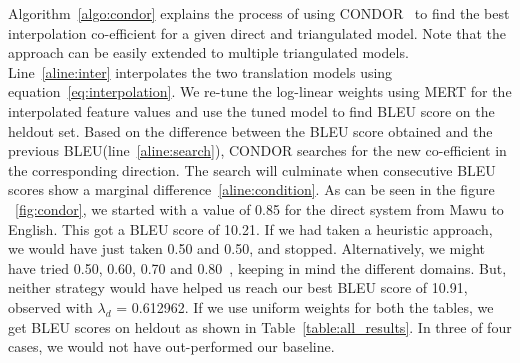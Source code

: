        Algorithm~\ref{algo:condor} explains the process of using CONDOR~\cite{condor-practice} to find the best interpolation co-efficient for a given direct and triangulated model. Note that the approach can be easily extended to multiple triangulated models. Line~\ref{aline:inter} interpolates the two translation models using equation~\eqref{eq:interpolation}. We re-tune the log-linear weights using MERT for the interpolated feature values and use the tuned model to find BLEU score on the heldout set. Based on the difference between the BLEU score obtained and the previous BLEU(line~\ref{aline:search}), CONDOR searches for the new co-efficient in the corresponding direction. The search will culminate when consecutive BLEU scores show a marginal difference~\ref{aline:condition}. As can be seen in the figure ~\ref{fig:condor}, we started with a value of 0.85 for the direct system from Mawu to English. This got a BLEU score of 10.21. If we had taken a heuristic approach, we would have just taken 0.50 and 0.50, and stopped. Alternatively, we might have tried 0.50, 0.60, 0.70 and 0.80~\cite{Nakov:12}, keeping in mind the different domains. But, neither strategy would have helped us reach our best BLEU score of 10.91, observed with $\lambda_{d}$ = 0.612962. If we use uniform weights for both the tables, we get BLEU scores on heldout as shown in Table~\ref{table:all_results}. In three of four cases, we would not have out-performed our baseline.



